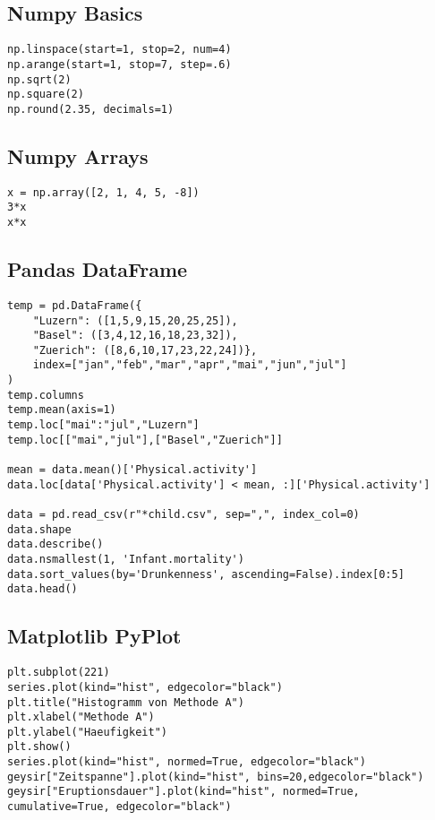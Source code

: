 \documentclass[14pt]{article}
\begin{document}
\begin{multicols}{3}
\subsection*{Numpy Basics}
\begin{verbatim}
np.linspace(start=1, stop=2, num=4)
np.arange(start=1, stop=7, step=.6)
np.sqrt(2)
np.square(2)
np.round(2.35, decimals=1)
\end{verbatim}

\subsection*{Numpy Arrays}
\begin{verbatim}
x = np.array([2, 1, 4, 5, -8])
3*x
x*x
\end{verbatim}

\subsection*{Pandas DataFrame}
\begin{verbatim}
temp = pd.DataFrame({
	"Luzern": ([1,5,9,15,20,25,25]),
	"Basel": ([3,4,12,16,18,23,32]),
	"Zuerich": ([8,6,10,17,23,22,24])},
	index=["jan","feb","mar","apr","mai","jun","jul"]
)
temp.columns
temp.mean(axis=1)
temp.loc["mai":"jul","Luzern"]
temp.loc[["mai","jul"],["Basel","Zuerich"]]

mean = data.mean()['Physical.activity']
data.loc[data['Physical.activity'] < mean, :]['Physical.activity']

data = pd.read_csv(r"*child.csv", sep=",", index_col=0)
data.shape
data.describe()
data.nsmallest(1, 'Infant.mortality')
data.sort_values(by='Drunkenness', ascending=False).index[0:5]
data.head()
\end{verbatim}

\subsection*{Matplotlib PyPlot}
\begin{verbatim}
plt.subplot(221)
series.plot(kind="hist", edgecolor="black")
plt.title("Histogramm von Methode A")
plt.xlabel("Methode A")
plt.ylabel("Haeufigkeit")
plt.show()
series.plot(kind="hist", normed=True, edgecolor="black")
geysir["Zeitspanne"].plot(kind="hist", bins=20,edgecolor="black")
geysir["Eruptionsdauer"].plot(kind="hist", normed=True, cumulative=True, edgecolor="black")
\end{verbatim}

\end{multicols}
\end{document}
